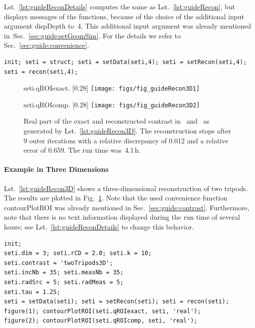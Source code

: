 \documentclass[a4paper]{article}
\begin{document}
Lst.~\ref{lst:guideReconDetails} computes the same as Lst.~\ref{lst:guideRecon}, but displays messages of the functions, because of the choice of the additional input argument \textsf{dispDepth} to~4. This additional input argument was already mentioned in~Sec.~\ref{sec:guide:setGeomSim}. For the details we refer to Sec.~\ref{sec:guide:convenience}.

\begin{lstlisting}[caption={Variational reconstruction with display of messages (\emph{source code}: \textsf{guides/guideReconDetails.m}).},label=lst:guideReconDetails]
init; seti = struct; seti = setData(seti,4); seti = setRecon(seti,4); seti = recon(seti,4);
\end{lstlisting}

\begin{figure}
\centering
\begin{subcaptionbox}{\textsf{seti.qROIexact}.
   \label{fig:guide:recon3D1}}[0.28\textwidth]{
   \texttt{[image: figs/fig\_guideRecon3D1]}
  }
\end{subcaptionbox}
\begin{subcaptionbox}{\textsf{seti.qROIcomp}.
   \label{fig:guide:recon3D2}}[0.28\textwidth]{
   \texttt{[image: figs/fig\_guideRecon3D2]}
  }
\end{subcaptionbox}
\caption{Real part of the exact and reconstructed contrast in~ and~ as generated by Lst.~\ref{lst:guideRecon3D}. The reconstruction stops after 9 outer iterations with a relative discrepancy of 0.012 and a relative error of 0.659. The run time was~4.1\,h.}
\label{fig:guide:recon3D}
\end{figure}

\paragraph{Example in Three Dimensions} Lst.~\ref{lst:guideRecon3D} shows a three-dimensional reconstruction of two tripods. The results are plotted in Fig.~\ref{fig:guide:recon3D}. Note that the used convenience function \textsf{contourPlotROI} was already mentioned in Sec.~\ref{sec:guide:contrast}. Furthermore, note that there is no text information displayed during the run time of several hours; see Lst.~\ref{lst:guideReconDetails} to change this behavior.

\begin{lstlisting}[caption={Variational reconstruction in three dimensions (\emph{source code}: \textsf{guides/guideRecon3D.m}).},label=lst:guideRecon3D]
init;
seti.dim = 3; seti.rCD = 2.0; seti.k = 10;
seti.contrast = 'twoTripods3D';
seti.incNb = 35; seti.measNb = 35;
seti.radSrc = 5; seti.radMeas = 5;
seti.tau = 1.25;
seti = setData(seti); seti = setRecon(seti); seti = recon(seti);
figure(1); contourPlotROI(seti.qROIexact, seti, 'real');
figure(2); contourPlotROI(seti.qROIcomp, seti, 'real');
\end{lstlisting}
\end{document}
